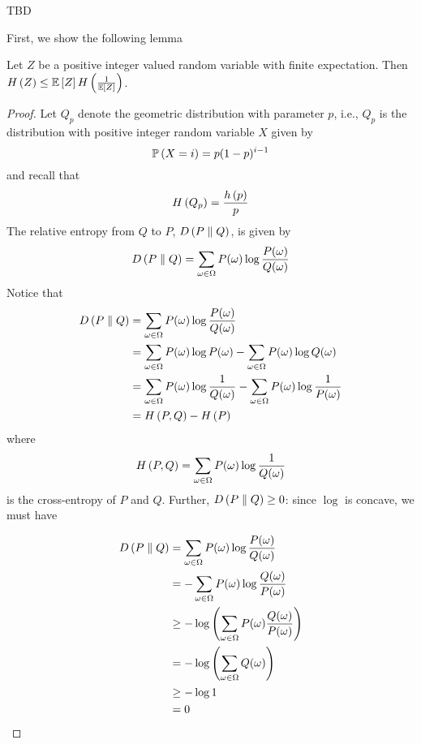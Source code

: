 \begin{example}
    TBD
\end{example}

First, we show the following lemma
\begin{lemma}
    \label{lem:posintrvent}
    Let $Z$ be a positive integer valued random variable with finite expectation.
    Then $\entropy{Z} \leq \expectation{Z}\entropy{\frac{1}{\expectation{Z}}}$.
\end{lemma}

\begin{proof}
    Let $Q_p$ denote the geometric distribution with parameter $p$, i.e., $Q_p$
    is the distribution with positive integer random variable $X$ given by
    \[\prob{X = i} = p(1 - p)^{i-1}\]
    and recall that
    \[H\left(Q_p\right) = \frac{h\left(p\right)}{p}\]
    The relative entropy from $Q$ to $P$, $D\left(P \parallel Q\right)$, is given by
    \[D\left(P \parallel Q\right) = \sum_{\omega\in\Omega}P(\omega)\log{\frac{P(\omega)}{Q(\omega)}}\]
    Notice that
    \begin{align*}D\left(P \parallel Q\right)
         & = \sum_{\omega\in\Omega}P(\omega)\log{\frac{P(\omega)}{Q(\omega)}}                                                \\
         & = \sum_{\omega\in\Omega}P(\omega)\log{P(\omega)} - \sum_{\omega\in\Omega}P(\omega)\log{Q(\omega)}                 \\
         & = \sum_{\omega\in\Omega}P(\omega)\log\frac{1}{Q(\omega)} - \sum_{\omega\in\Omega}P(\omega)\log\frac{1}{P(\omega)} \\
         & = H\left(P, Q\right) - H\left(P\right)
    \end{align*}
    where
    \[H\left(P, Q\right) = \sum_{\omega\in\Omega}P(\omega)\log\frac{1}{Q(\omega)}\]
    is the cross-entropy of $P$ and $Q$. Further, $D\left(P \parallel Q\right) \geq 0$: since
    $\log$ is concave, we must have

    \begin{align*}D\left(P \parallel Q\right)
         & = \sum_{\omega\in\Omega}P(\omega)\log{\frac{P(\omega)}{Q(\omega)}}                \\
         & = -\sum_{\omega\in\Omega}P(\omega)\log{\frac{Q(\omega)}{P(\omega)}}               \\
         & \geq -\log\left(\sum_{\omega\in\Omega}P(\omega)\frac{Q(\omega)}{P(\omega)}\right) \\
         & = -\log\left(\sum_{\omega\in\Omega}Q(\omega)\right)                               \\
         & \geq -\log{1}                                                                     \\
         & = 0
    \end{align*}


\end{proof}
